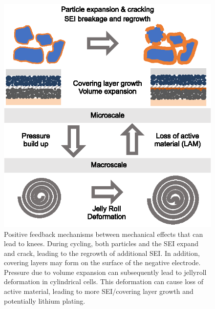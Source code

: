 \documentclass[journal=jpclcd,manuscript=article]{achemso}
\begin{document}
\begin{figure}
\centering
\includegraphics[scale = 1]{figures/mechanical.eps}
\caption{Positive feedback mechanisms between mechanical effects that can lead to knees. During cycling, both particles and the SEI expand and crack, leading to the regrowth of additional SEI. In addition, covering layers may form on the surface of the negative electrode. Pressure due to volume expansion can subsequently lead to jellyroll deformation in cylindrical cells. This deformation can cause loss of active material, leading to more SEI/covering layer growth and potentially lithium plating.}
\label{fig:knee_mechanical}
\end{figure}
\end{document}
